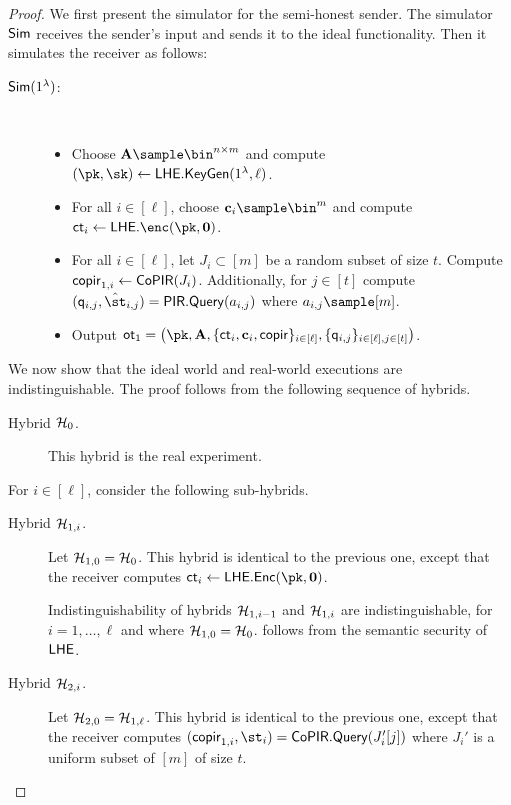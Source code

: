 \begin{proof}
We first present the simulator for the semi-honest sender. The simulator $\mathsf{Sim}$ receives the sender's input and sends it to the ideal functionality. Then it simulates the receiver as follows:

\begin{description}
\item[$\mathsf{Sim}(1^\lambda)$:]~
\begin{itemize}
    \item Choose $\An\sample \bin^{n\times m}$ and compute $(\pk,\sk)\gets \LHE.\keygen(1^\lambda,\ell)$.
    \item For all $i\in[\ell]$, choose $\cn_i\sample \bin^m$ and compute $\ct_i\gets \LHE.\enc(\pk,\mathbf{0})$.
    \item For all $i\in [\ell]$, let $J_i\subset [m]$ be a random subset of size $t$. Compute $\mathsf{copir}_{1,i}\leftarrow\mathsf{CoPIR}(J_i)$. Additionally, for $j\in [t]$ compute $(\quer_{i,j},\hat{\st}_{i,j}) = \PIR.\query(a_{i,j})$ where $a_{i,j}\sample [m]$.
    \item Output $\ot_1=\left(\pk,\vc{A},\{\ct_i,\vc{c}_i,\copir\}_{i\in [\ell]},\{\quer_{i,j}\}_{i \in [\ell], j \in [t]}\right)$.
\end{itemize}
\end{description}

We now show that the ideal world and real-world executions are indistinguishable. 
The proof follows from the following sequence of hybrids.

\begin{description}
\item[Hybrid $\mathcal{H}_0$.] This hybrid is the real experiment.
\end{description}


For $i\in[\ell]$, consider the following sub-hybrids.

\begin{description}
\item[Hybrid $\mathcal{H}_{1,i}$.] Let $\mathcal{H}_{1,0}=\mathcal{H}_0$. This hybrid is identical to the previous one, except that the receiver computes $\ct_i\leftarrow\mathsf{LHE.Enc}(\pk,\mathbf{0})$. %

Indistinguishability of hybrids $\mathcal{H}_{1,i-1}$ and $\mathcal{H}_{1,i}$ are indistinguishable, for $i=1,\dots,\ell$ and where $\mathcal{H}_{1,0}=\mathcal{H}_0$. follows from the semantic security of $\mathsf{LHE}$.


\item[Hybrid $\mathcal{H}_{2,i}$.] Let $\mathcal{H}_{2,0}=\mathcal{H}_{1,\ell}$. This hybrid is identical to the previous one, except that the receiver computes $(\copir_{1,i},\st_i) = \CoPIR.\query(J_i'[j])$ where $J_i'$ is a uniform subset of $[m]$ of size $t$.


\end{description}
\end{proof}
